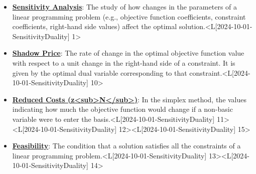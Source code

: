 \documentclass{article}%
\begin{document}
\begin{itemize}[[leftmargin=*]]
\item \href{https://www.math.purdue.edu/~yipn/421/2024-10-01-SensitivityDuality.pdf#page=1}{\textbf{Sensitivity Analysis}}: The study of how changes in the parameters of a linear programming problem (e.g., objective function coefficients, constraint coefficients, right-hand side values) affect the optimal solution.<L[2024-10-01-SensitivityDuality] 1>%
\item \href{https://www.math.purdue.edu/~yipn/421/2024-10-01-SensitivityDuality.pdf#page=10}{\textbf{Shadow Price}}: The rate of change in the optimal objective function value with respect to a unit change in the right-hand side of a constraint. It is given by the optimal dual variable corresponding to that constraint.<L[2024-10-01-SensitivityDuality] 10>%
\item \href{https://www.math.purdue.edu/~yipn/421/2024-10-01-SensitivityDuality.pdf#page=11}{\textbf{Reduced Costs (z<sub>N</sub>)}}: In the simplex method, the values indicating how much the objective function would change if a non-basic variable were to enter the basis.<L[2024-10-01-SensitivityDuality] 11><L[2024-10-01-SensitivityDuality] 12><L[2024-10-01-SensitivityDuality] 15>%
\item \href{https://www.math.purdue.edu/~yipn/421/2024-10-01-SensitivityDuality.pdf#page=13}{\textbf{Feasibility}}: The condition that a solution satisfies all the constraints of a linear programming problem.<L[2024-10-01-SensitivityDuality] 13><L[2024-10-01-SensitivityDuality] 14>%
\end{itemize}%
\end{document}
